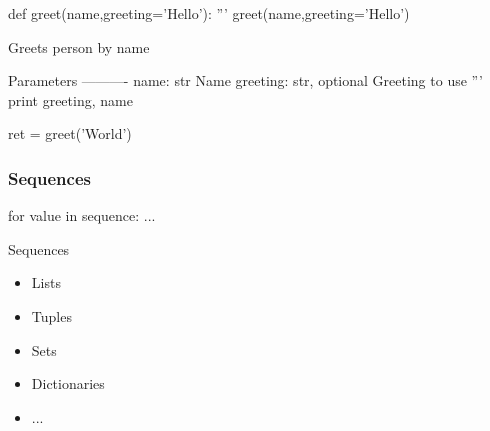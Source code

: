 \begin{frame}[fragile]

\begin{python}
def greet(name,greeting='Hello'):
    '''
    greet(name,greeting='Hello')

    Greets person by name

    Parameters
    ----------
    name: str
        Name
    greeting: str, optional
        Greeting to use
    '''
    print greeting, name

ret = greet('World')

\end{python}

\end{frame}

\begin{frame}[fragile]
\frametitle{Sequences}

\begin{python}
for value in sequence:
    ...
\end{python}

\begin{block}{Sequences}
\begin{itemize}
\item Lists
\item Tuples
\item Sets
\item Dictionaries
\item ...
\end{itemize}
\end{block}
\end{frame}



